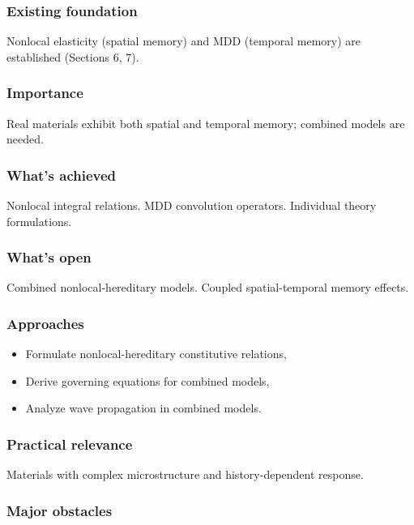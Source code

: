 \subsubsection{Existing foundation}

Nonlocal elasticity (spatial memory) and MDD (temporal memory) are established (Sections 6, 7).

\subsubsection{Importance}

Real materials exhibit both spatial and temporal memory; combined models are needed.

\subsubsection{What's achieved}

Nonlocal integral relations. MDD convolution operators. Individual theory formulations.

\subsubsection{What's open}

Combined nonlocal-hereditary models. Coupled spatial-temporal memory effects.

\subsubsection{Approaches}

\begin{itemize}
\item Formulate nonlocal-hereditary constitutive relations,
\item Derive governing equations for combined models,
\item Analyze wave propagation in combined models.
\end{itemize}

\subsubsection{Practical relevance}

Materials with complex microstructure and history-dependent response.

\subsubsection{Major obstacles}


